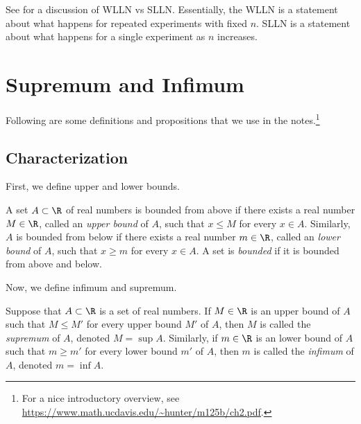\documentclass{article} %
\begin{document}
\begin{remark} See \cite[pp.199]{ash2000probability} for a discussion of WLLN vs SLLN.  Essentially, the WLLN is a statement about what happens for repeated experiments with fixed $n$. SLLN is a statement about what happens for a single experiment as $n$ increases. 
\end{remark}



 
\newpage 
\appendix

\section{Supremum and Infimum}

Following are some definitions and propositions that we use in the notes.\footnote{For a nice introductory overview, see \url{https://www.math.ucdavis.edu/~hunter/m125b/ch2.pdf}.}

\subsection{Characterization}

First, we define upper and lower bounds.
\begin{definition}
A set $A \subset \R$ of real numbers is bounded from above if there exists a real number $M \in \R$, called an \textit{upper bound} of $A$, such that $x \leq M$ for every $x \in A$.  Similarly, $A$  is bounded from below if there exists a real number $m \in \R$, called an \textit{lower bound} of $A$, such that $x \geq m$ for every $x \in A$.  A set is \textit{bounded} if it is bounded from above and below.
\label{def:upper_and_lower_bound}	
\end{definition}


Now, we define infimum and supremum.
\begin{definition}
Suppose that $A \subset \R$ is a set of real numbers. If $M \in \R$ is an upper bound of $A$ such that $M \leq M'$ for every upper bound $M'$ of $A$, then $M$ is called the \textit{supremum} of $A$, denoted $M=\sup A$.   Similarly, if $m \in \R$ is an lower bound of $A$ such that $m \geq m'$ for every lower bound $m'$ of $A$, then $m$ is called the \textit{infimum} of $A$, denoted $m=\inf A$.\label{def:supremum_and_infimum}	
\end{definition}
\end{document}
